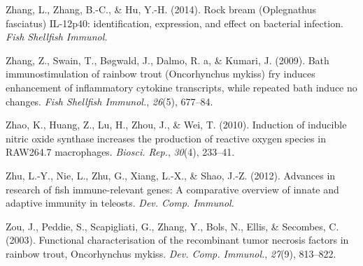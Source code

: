 \documentclass[12pt,a4paper,oneside]{scrbook}
\begin{document}
Zhang, L., Zhang, B.-C., \& Hu, Y.-H. (2014). Rock bream (Oplegnathus
fasciatus) IL-12p40: identification, expression, and effect on bacterial
infection. \emph{Fish Shellfish Immunol.}

Zhang, Z., Swain, T., Bøgwald, J., Dalmo, R. a, \& Kumari, J. (2009).
Bath immunostimulation of rainbow trout (Oncorhynchus mykiss) fry
induces enhancement of inflammatory cytokine transcripts, while repeated
bath induce no changes. \emph{Fish Shellfish Immunol.}, \emph{26}(5),
677--84.

Zhao, K., Huang, Z., Lu, H., Zhou, J., \& Wei, T. (2010). Induction of
inducible nitric oxide synthase increases the production of reactive
oxygen species in RAW264.7 macrophages. \emph{Biosci. Rep.},
\emph{30}(4), 233--41.

Zhu, L.-Y., Nie, L., Zhu, G., Xiang, L.-X., \& Shao, J.-Z. (2012).
Advances in research of fish immune-relevant genes: A comparative
overview of innate and adaptive immunity in teleosts. \emph{Dev. Comp.
Immunol.}

Zou, J., Peddie, S., Scapigliati, G., Zhang, Y., Bols, N., Ellis, \&
Secombes, C. (2003). Functional characterisation of the recombinant
tumor necrosis factors in rainbow trout, Oncorhynchus mykiss. \emph{Dev.
Comp. Immunol.}, \emph{27}(9), 813--822.
\end{document}
